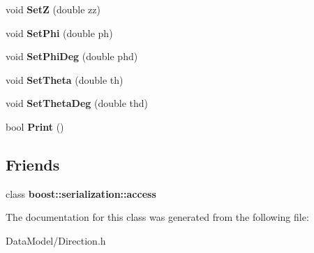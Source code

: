 \begin{DoxyCompactItemize}
\item 
\hypertarget{classDirection_af79a87b020ea1122d7754f8c382e5973}{void {\bfseries Set\-Z} (double zz)}\label{classDirection_af79a87b020ea1122d7754f8c382e5973}

\item 
\hypertarget{classDirection_acb7c66942c436968aa207945362afdc0}{void {\bfseries Set\-Phi} (double ph)}\label{classDirection_acb7c66942c436968aa207945362afdc0}

\item 
\hypertarget{classDirection_a1d14bbfe02ca398b2cd6ae175cd05a8a}{void {\bfseries Set\-Phi\-Deg} (double phd)}\label{classDirection_a1d14bbfe02ca398b2cd6ae175cd05a8a}

\item 
\hypertarget{classDirection_ac14dae5fc8c04039b68f5c4afa1444de}{void {\bfseries Set\-Theta} (double th)}\label{classDirection_ac14dae5fc8c04039b68f5c4afa1444de}

\item 
\hypertarget{classDirection_aed59dbad937a7d05bd7bb90344869e32}{void {\bfseries Set\-Theta\-Deg} (double thd)}\label{classDirection_aed59dbad937a7d05bd7bb90344869e32}

\item 
\hypertarget{classDirection_aa0dc919856fbf935470d8e34d042bc9a}{bool {\bfseries Print} ()}\label{classDirection_aa0dc919856fbf935470d8e34d042bc9a}

\end{DoxyCompactItemize}
\subsection*{Friends}
\begin{DoxyCompactItemize}
\item 
\hypertarget{classDirection_ac98d07dd8f7b70e16ccb9a01abf56b9c}{class {\bfseries boost\-::serialization\-::access}}\label{classDirection_ac98d07dd8f7b70e16ccb9a01abf56b9c}

\end{DoxyCompactItemize}


The documentation for this class was generated from the following file\-:\begin{DoxyCompactItemize}
\item 
Data\-Model/Direction.\-h\end{DoxyCompactItemize}
